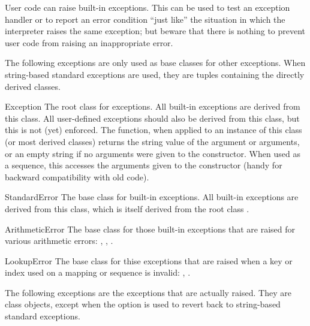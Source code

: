 User code can raise built-in exceptions.  This can be used to test an
exception handler or to report an error condition ``just like'' the
situation in which the interpreter raises the same exception; but
beware that there is nothing to prevent user code from raising an
inappropriate error.

\renewcommand{\indexsubitem}{(built-in exception base class)}

The following exceptions are only used as base classes for other
exceptions.  When string-based standard exceptions are used, they
are tuples containing the directly derived classes.

\begin{excdesc}{Exception}
The root class for exceptions.  All built-in exceptions are derived
from this class.  All user-defined exceptions should also be derived
from this class, but this is not (yet) enforced.  The 
function, when applied to an instance of this class (or most derived
classes) returns the string value of the argument or arguments, or an
empty string if no arguments were given to the constructor.  When used
as a sequence, this accesses the arguments given to the constructor
(handy for backward compatibility with old code).
\end{excdesc}

\begin{excdesc}{StandardError}
The base class for built-in exceptions.  All built-in exceptions are
derived from this class, which is itself derived from the root class
.
\end{excdesc}

\begin{excdesc}{ArithmeticError}
The base class for those built-in exceptions that are raised for
various arithmetic errors: ,
, .
\end{excdesc}

\begin{excdesc}{LookupError}
The base class for thise exceptions that are raised when a key or
index used on a mapping or sequence is invalid: ,
.
\end{excdesc}

\renewcommand{\indexsubitem}{(built-in exception)}

The following exceptions are the exceptions that are actually raised.
They are class objects, except when the  option is used to
revert back to string-based standard exceptions.

